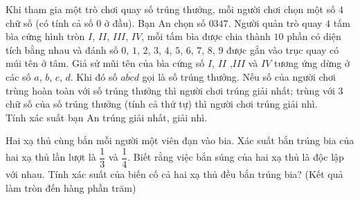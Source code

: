\begin{bt}%

	Khi tham gia một trò chơi quay số trúng thưởng, mỗi người chơi chọn một số $4$ chữ số (có tính cả số $0$ ở đầu). Bạn An chọn số $0347$. Người quản trò quay $4$ tấm bìa cứng hình tròn $I$, $II$, $III$, $IV$, mỗi tấm bìa được chia thành $10$ phần có diện tích bằng nhau và đánh số $0$, $1$, $2$, $3$, $4$, $5$, $6$, $7$, $8$, $9$ được gắn vào trục quay có múi tên ở tâm. Giả sử mũi tên của bìa cứng số $I$, $II$ ,$III$ và $IV$ tương ứng dừng ở các số $a$, $b$, $c$, $d$. Khi đó số $\overline{abcd}$ gọi là số trúng thưởng. Nếu số của người chơi trùng hoàn toàn với số trúng thưởng thì người chơi trúng giải nhất; trùng với $3$ chữ số của số trúng thưởng (tính cả thứ tự) thì người chơi trúng giải nhì.\\
	Tính xác suất bạn An trúng giải nhất, giải nhì.
\end{bt}

\begin{bt}%

	Hai xạ thủ cùng bắn mỗi người một viên đạn vào bia. Xác suất bắn trúng bia của hai xạ thủ lần lượt là $\dfrac{1}{3}$ và $\dfrac{1}{4}$. Biết rằng việc bắn súng của hai xạ thủ là độc lập với nhau.	Tính xác suất của biến cố cả hai xạ thủ đều bắn trúng bia? (Kết quả làm tròn đến hàng phần trăm)
\end{bt}

